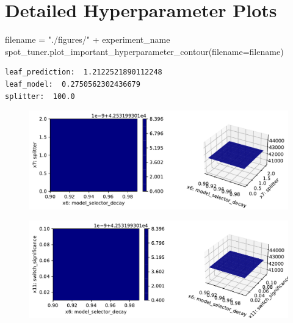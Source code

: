 \documentclass[
  letterpaper,
  DIV=11,
  numbers=noendperiod]{scrreprt}
\newenvironment{Shaded}{\begin{snugshade}}{\end{snugshade}}
\newcommand{\NormalTok}[1]{\textcolor[rgb]{0.00,0.23,0.31}{#1}}
\newcommand{\OperatorTok}[1]{\textcolor[rgb]{0.37,0.37,0.37}{#1}}
\newcommand{\StringTok}[1]{\textcolor[rgb]{0.13,0.47,0.30}{#1}}
\begin{document}
\hypertarget{detailed-hyperparameter-plots-5}{%
\section{Detailed Hyperparameter
Plots}\label{detailed-hyperparameter-plots-5}}

\begin{Shaded}
\begin{Highlighting}[]
\NormalTok{filename }\OperatorTok{=} \StringTok{"./figures/"} \OperatorTok{+}\NormalTok{ experiment\_name}
\NormalTok{spot\_tuner.plot\_important\_hyperparameter\_contour(filename}\OperatorTok{=}\NormalTok{filename)}
\end{Highlighting}
\end{Shaded}

\begin{verbatim}
leaf_prediction:  1.2122521890112248
leaf_model:  0.2750562302436679
splitter:  100.0
\end{verbatim}

\begin{figure}[H]

{\centering \includegraphics{024_spot_hpt_river_friedman_hatr_files/figure-pdf/cell-44-output-2.pdf}

}

\end{figure}

\begin{figure}[H]

{\centering \includegraphics{024_spot_hpt_river_friedman_hatr_files/figure-pdf/cell-44-output-3.pdf}

}

\end{figure}
\end{document}
